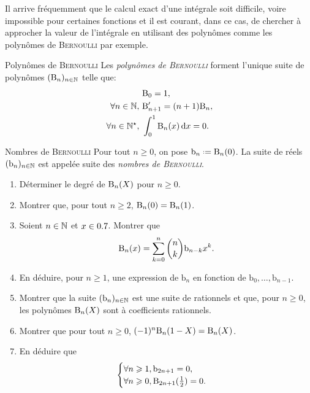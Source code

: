 
Il arrive fréquemment que le calcul exact d’une intégrale soit difficile, voire
impossible pour certaines fonctions et il est courant, dans ce cas, de chercher à
approcher la valeur de l’intégrale en utilisant des polynômes comme les polynômes de \textsc{Bernoulli} par exemple.

\begin{defi}{Polynômes de \textsc{Bernoulli}}
    Les \emph{polynômes de \textsc{Bernoulli}} forment l'unique suite de polynômes $(\mathrm{B}_n)_{n \in \mathbb{N}}$ telle que:
    \begin{align*}
        &\mathrm{B}_0 = 1, \\
        \forall n \in \mathbb{N},\ &\mathrm{B}'_{n+1} = (n+1)\mathrm{B}_n, \\
        \forall n \in \mathbb{N}^\star,\ &\int_{0}^{1} \mathrm{B}_n(x) \, \mathrm{d} x = 0.
    \end{align*}
\end{defi}

\begin{defi}{Nombres de \textsc{Bernoulli}}
    Pour tout $n \geqslant 0$, on pose $\mathrm{b}_n \defeq \Bern_n(0)$. La suite de réels $(\mathrm{b}_n)_{n \in \mathbb{N}}$ est appelée suite des \emph{nombres de \textsc{Bernoulli}}.
\end{defi}  

\begin{exercice}
    \begin{enumerate}
        \item Déterminer le degré de $\mathrm{B}_n(X)$ pour $n \geqslant 0$. 
        \item Montrer que, pour tout $n \geqslant 2$, $\mathrm{B}_n(0) = \mathrm{B}_n(1)$.
        \item Soient $n \in \mathbb{N}$ et $x \in 0.7$. Montrer que 
        $$\mathrm{B}_n(x) = \sum_{k=0}^n \binom{n}{k} \mathrm{b}_{n-k} x^k.$$
        \item En déduire, pour $n \geqslant 1$, une expression de $\mathrm{b}_n$ en fonction de $\mathrm{b}_0, \dots, \mathrm{b}_{n-1}$.
        \item Montrer que la suite $(\mathrm{b}_n)_{n \in \mathbb{N}}$ est une suite de rationnels et que, pour $n \geqslant 0$, les polynômes $\mathrm{B}_n(X)$ sont à coefficients rationnels.
        \item Montrer que pour tout $n \geqslant 0$, $(-1)^n \mathrm{B}_n(1-X) = \mathrm{B}_n(X)$.
        \item En déduire que 
        $$
        \begin{cases}
            \forall n \geqslant 1, \mathrm{b}_{2n+1} = 0, \\
            \forall n \geqslant 0, \mathrm{B}_{2n+1}(\frac{1}{2}) = 0.
        \end{cases}
        $$
    \end{enumerate}    
\end{exercice}
